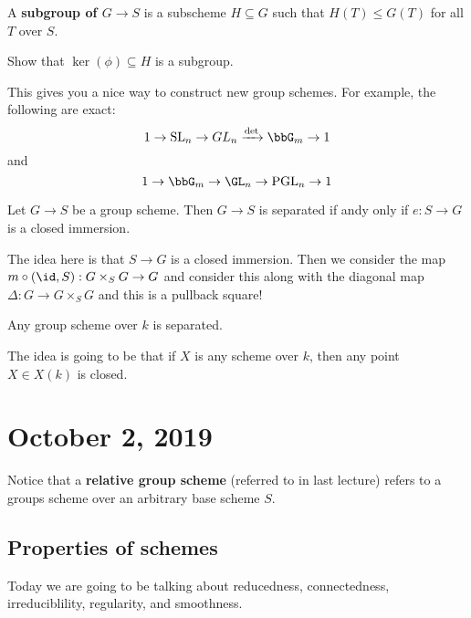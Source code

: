 \documentclass[12pt]{article}
\begin{document}
\begin{defn}
	A \textbf{subgroup of $G\to S$} is a subscheme $H\subseteq G$ such that $H(T)\le G(T)$ for all $T$ over $S$.
\end{defn}
\begin{prob}
	Show that $\ker(\phi)\subseteq H$ is a subgroup.
\end{prob}
\begin{rmk}
	This gives you a nice way to construct new group schemes. For example, the following are exact:
	\[1\to \operatorname{SL}_n\to GL_n\xrightarrow{\det} \bbG_m\to 1\]
	and 
	\[1\to \bbG_m\to \GL_n\to \operatorname{PGL}_n\to 1\]
\end{rmk}

\begin{prop}
	Let $G\to S$ be a group scheme. Then $G\to S$ is separated if andy only if $e:S\to G$ is a closed immersion.
\end{prop}
\begin{prf}
	The idea here is that $S\to G$ is a closed immersion. Then we consider the map $m\circ(\id,S):G\times_SG\to G$
	and consider this along with the diagonal map $\Delta:G\to G\times_S G$ and this is a pullback square!
\end{prf}
\begin{cor}
	Any group scheme over $k$ is separated.
\end{cor}
The idea is going to be that if $X$ is any scheme over $k$, then any point $X\in X(k)$ is closed.

\section{October 2, 2019}
Notice that a \textbf{relative group scheme} (referred to in last lecture) refers to a groups scheme over an arbitrary 
base scheme $S$.

\subsection{Properties of schemes}
Today we are going to be talking about reducedness, connectedness, irreduciblility, regularity, and smoothness.
\end{document}
